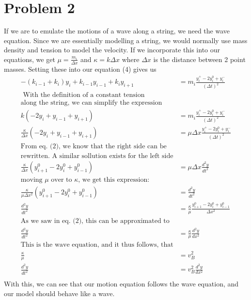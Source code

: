 \documentclass[12pt]{article}
\begin{document}
\section*{Problem 2}
	If we are to emulate the motions of a wave along a string, we need the wave equation. Since we are essentially modelling a string, we would normally use mass density and tension to model the velocity. If we incorporate this into our equations, we get $\mu = \frac{m_i}{\Delta x}$ and $\kappa = k\Delta x$ where $\Delta x$ is the distance between 2 point masses. Setting these into our equation (4) gives us
\begin{equation}
	\begin{aligned}
		-(k_{i-1} + k_i)y_i + k_{i-1}y_{i-1} + k_iy_{i+1} &=
				 m_i \frac{y_i^+ - 2y_i^0 + y_i^-}{(\Delta t)^2} \\
		\text{ With the definition of a constant tension }\\
		\text{along the string, we can simplify the 
			expression} \\
		k ( -2y_i + y_{i-1} + y_{i+1} ) &= m_i \frac{y_i^+ - 2y_i^0 + y_i^-}{(\Delta t)^2} \\
		\frac{\kappa}{\Delta x} ( -2y_i + y_{i-1} + y_{i+1} ) &= \mu \Delta x \frac{y_i^+ - 2y_i^0 + 
		y_i^-}{(\Delta t)^2} \\
		\text{From eq. (2), we know that the right side can be} \\
		\text{rewritten. A similar sollution exists for the left side} \\		
		\frac{\kappa}{\Delta x}(y_{i+1}^0 - 2y_i^0 + y_{i-1}^0) &= \mu \Delta x \frac{d^2y}{dt^2} \\
		\text{moving $\mu$ over to $\kappa$, we get this expression:} \\
		\frac{\kappa}{\mu \Delta x^2}(y_{i+1}^0 - 2y_i^0 + y_{i-1}^0) &= \frac{d^2y}{dt^2} \\
		\frac{d^2y}{dt^2} &= \frac{\kappa}{\mu} \frac{y_{i+1}^0 - 2y_i^0 + y_{i-1}^0}{\Delta x^2} \\
		\text{As we saw in eq. (2), this can be approximated to} \\
		\frac{d^2y}{dt^2} &= \frac{\kappa}{\mu}\frac{d^2y}{dx^2} \\
		\text{This is the wave equation, and it thus follows, that} \\
		\frac{\kappa}{\mu} &= v_B^2 \\
		\frac{d^2y}{dt^2} &= v_B^2\frac{d^2y}{dx^2} \\
	\end{aligned}
\end{equation}
With this, we can see that our motion equation follows the wave equation, and our model should behave like a wave.
\end{document}
